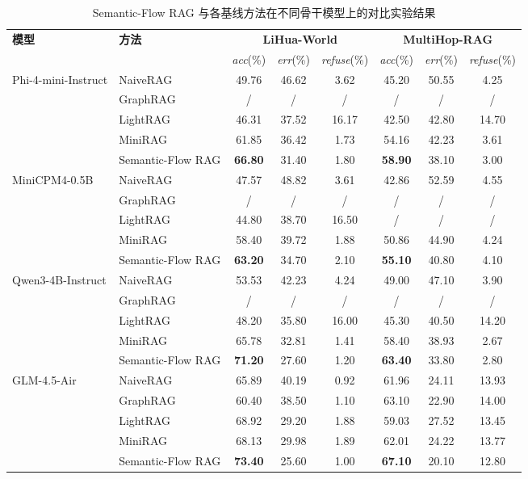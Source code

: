 \documentclass[promaster, vlined]{DissertUESTC}
\begin{document}
\begin{table}[!ht]
\centering
\caption{Semantic-Flow RAG 与各基线方法在不同骨干模型上的对比实验结果}
\label{tab:semantic_flow_compare}
\setlength{\tabcolsep}{2.6pt}
\small
\begin{tabular*}{\textwidth}{@{\extracolsep{\fill}}ll|ccc|ccc}
\toprule
\textbf{模型} & \textbf{方法} & \multicolumn{3}{c|}{\textbf{LiHua-World}} & \multicolumn{3}{c}{\textbf{MultiHop-RAG}} \\
\cmidrule(lr){3-5} \cmidrule(lr){6-8}
 &  & \textit{acc}(\%) & \textit{err}(\%) & \textit{refuse}(\%) & \textit{acc}(\%) & \textit{err}(\%) & \textit{refuse}(\%) \\
\midrule
\multirow{5}{*}{Phi-4-mini-Instruct}
& NaiveRAG          & 49.76 & 46.62 & 3.62 & 45.20 & 50.55 & 4.25 \\
& GraphRAG          & / & / & / & / & / & / \\
& LightRAG          & 46.31 & 37.52 & 16.17 & 42.50 & 42.80 & 14.70 \\
& MiniRAG           & 61.85 & 36.42 & 1.73 & 54.16 & 42.23 & 3.61 \\
& Semantic-Flow RAG & \textbf{66.80} & 31.40 & 1.80 & \textbf{58.90} & 38.10 & 3.00 \\
\midrule
\multirow{5}{*}{MiniCPM4-0.5B}
& NaiveRAG          & 47.57 & 48.82 & 3.61 & 42.86 & 52.59 & 4.55 \\
& GraphRAG          & / & / & / & / & / & / \\
& LightRAG          & 44.80 & 38.70 & 16.50 & / & / & / \\
& MiniRAG           & 58.40 & 39.72 & 1.88 & 50.86 & 44.90 & 4.24 \\
& Semantic-Flow RAG & \textbf{63.20} & 34.70 & 2.10 & \textbf{55.10} & 40.80 & 4.10 \\
\midrule
\multirow{5}{*}{Qwen3-4B-Instruct}
& NaiveRAG          & 53.53 & 42.23 & 4.24 & 49.00 & 47.10 & 3.90 \\
& GraphRAG          & / & / & / & / & / & / \\
& LightRAG          & 48.20 & 35.80 & 16.00 & 45.30 & 40.50 & 14.20 \\
& MiniRAG           & 65.78 & 32.81 & 1.41 & 58.40 & 38.93 & 2.67 \\
& Semantic-Flow RAG & \textbf{71.20} & 27.60 & 1.20 & \textbf{63.40} & 33.80 & 2.80 \\
\midrule
\multirow{5}{*}{GLM-4.5-Air}
& NaiveRAG          & 65.89 & 40.19 & 0.92 & 61.96 & 24.11 & 13.93 \\
& GraphRAG          & 60.40 & 38.50 & 1.10 & 63.10 & 22.90 & 14.00 \\
& LightRAG          & 68.92 & 29.20 & 1.88 & 59.03 & 27.52 & 13.45 \\
& MiniRAG           & 68.13 & 29.98 & 1.89 & 62.01 & 24.22 & 13.77 \\
& Semantic-Flow RAG & \textbf{73.40} & 25.60 & 1.00 & \textbf{67.10} & 20.10 & 12.80 \\
\bottomrule
\end{tabular*}
\end{table}
\end{document}
